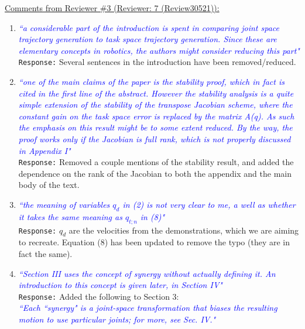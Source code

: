 \documentclass{article}
\begin{document}

\underline{Comments from Reviewer \#3 (Reviewer: 7 (Review30521)):}
\begin{enumerate}
\item \textcolor{blue}{\textit{``a considerable part of the introduction is spent in comparing joint space trajectory generation to task
space trajectory generation. Since these are elementary concepts in robotics, the authors might consider
reducing this part"}} \texttt{Response:} Several sentences in the introduction have been removed/reduced.\\

\item \textcolor{blue}{\textit{``one of the main claims of the paper is the stability proof, which in fact is cited in the first line of the
abstract. However the stability analysis is a quite simple extension of the stability of the transpose
Jacobian scheme, where the constant gain on the task space error is replaced by the matrix A(q). As
such the emphasis on this result might be to some extent reduced. By the way, the proof works only
if the Jacobian is full rank, which is not properly discussed in Appendix I"}}\\
\texttt{Response:}  Removed a couple mentions of the stability result, and added the dependence on the rank of the Jacobian to both the appendix and the main body of the text.\\

\item \textcolor{blue}{\textit{``the meaning of variables $q_d$ in (2) is not very clear to me, a well as whether it takes the same meaning
as $q_{t;n}$ in (8)"}}\\
\texttt{Response:} $q_d$ are the velocities from the demonstrations, which we are aiming to recreate. Equation (8) has been updated to remove the typo (they are in fact the same).\\

\item \textcolor{blue}{\textit{``Section III uses the concept of synergy without actually defining it. An introduction to this concept is given later, in Section IV"}}\\
\texttt{Response:} Added the following to Section 3:\\
\textcolor{blue}{\small \textit{``Each ``synergy" is a joint-space transformation that biases the resulting motion to use particular joints; for more, see Sec. IV."}}\\


\end{enumerate}
\end{document}
